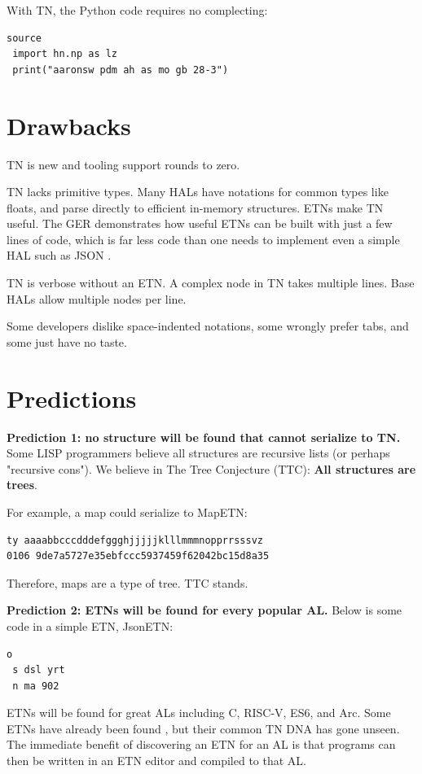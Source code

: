\documentclass[journal]{IEEEtran}
\begin{document}
With TN, the Python code requires no complecting:

\begin{lstlisting}
source
 import hn.np as lz
 print("aaronsw pdm ah as mo gb 28-3")
\end{lstlisting}

\section{Drawbacks}

TN is new and tooling support rounds to zero.

TN lacks primitive types. Many HALs have notations for common types like floats, and parse directly to efficient in-memory structures. ETNs make TN useful. The GER demonstrates how useful ETNs can be built with just a few lines of code, which is far less code than one needs to implement even a simple HAL such as JSON \cite{Ooms}.

TN is verbose without an ETN. A complex node in TN takes multiple lines. Base HALs allow multiple nodes per line.

Some developers dislike space-indented notations, some wrongly prefer tabs, and some just have no taste.

\section{Predictions}

\textbf{Prediction 1: no structure will be found that cannot serialize to TN.} Some LISP programmers believe all structures are recursive lists (or perhaps "recursive cons"). We believe in The Tree Conjecture (TTC): \textbf{All structures are trees}.

For example, a map could serialize to MapETN:

\begin{lstlisting}
ty aaaabbcccdddefggghjjjjjklllmmmnopprrsssvz
0106 9de7a5727e35ebfccc5937459f62042bc15d8a35
\end{lstlisting}

Therefore, maps are a type of tree. TTC stands.

\textbf{Prediction 2: ETNs will be found for every popular AL.} Below is some code in a simple ETN, JsonETN:

\begin{lstlisting}
o
 s dsl yrt
 n ma 902
\end{lstlisting}

ETNs will be found for great ALs including C, RISC-V, ES6, and Arc. Some ETNs have already been found \cite{Roughan}, but their common TN DNA has gone unseen. The immediate benefit of discovering an ETN for an AL is that programs can then be written in an ETN editor and compiled to that AL.
\end{document}
